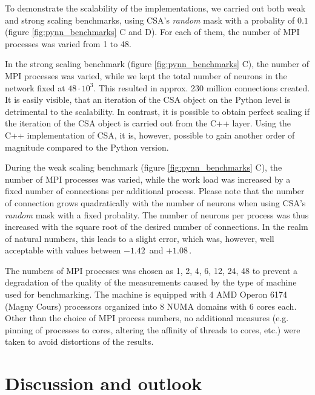 \documentclass{frontiersSCNS} %
\newcommand{\permil}{\,\textperthousand\xspace}
\begin{document}
To demonstrate the scalability of the implementations, we carried out
both weak and strong scaling benchmarks, using CSA's \emph{random}
mask with a probality of $0.1$ (figure \ref{fig:pynn_benchmarks} C and
D). For each of them, the number of MPI processes was varied from 1 to
48.

In the strong scaling benchmark (figure \ref{fig:pynn_benchmarks} C),
the number of MPI processes was varied, while we kept the total number
of neurons in the network fixed at $48 \cdot 10^3$. This resulted in
approx. 230 million connections created. It is easily visible, that an
iteration of the CSA object on the Python level is detrimental to the
scalability. In contrast, it is possible to obtain perfect scaling if
the iteration of the CSA object is carried out from the C++
layer. Using the C++ implementation of CSA, it is, however, possible
to gain another order of magnitude compared to the Python version.

During the weak scaling benchmark (figure \ref{fig:pynn_benchmarks}
C), the number of MPI processes was varied, while the work load was
increased by a fixed number of connections per additional process.
Please note that the number of connection grows quadratically with the
number of neurons when using CSA's \emph{random} mask with a fixed
probality. The number of neurons per process was thus increased with
the square root of the desired number of connections. In the realm of
natural numbers, this leads to a slight error, which was, however,
well acceptable with values between $-1.42$\permil and $+1.08$\permil.

The numbers of MPI processes was chosen as 1, 2, 4, 6, 12, 24, 48 to
prevent a degradation of the quality of the measurements caused by the
type of machine used for benchmarking. The machine is equipped with 4
AMD Operon 6174 (Magny Cours) processors organized into 8 NUMA domains
with 6 cores each. Other than the choice of MPI process numbers, no
additional measures (e.g. pinning of processes to cores, altering the
affinity of threads to cores, etc.) were taken to avoid distortions of
the results.


\section{Discussion and outlook}
\end{document}
